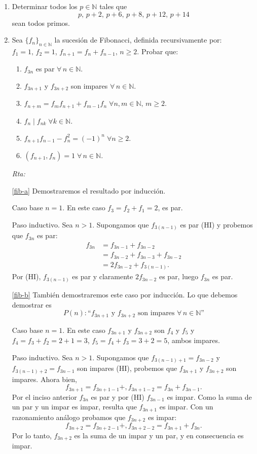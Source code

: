 \documentclass[a4paper,12pt,twoside,spanish,reqno]{amsbook}
\numberwithin{equation}{section}
\newcommand{\rta}{\noindent\textit{Rta: }}
\begin{document}
\begin{enumerate}
\item Determinar todos los $p\in\mathbb N$ tales que
\[ p,\, p+2,\, p+6,\, p+8,\, p+12,\, p+14 \]
sean todos primos.




\item  Sea $\{f_n\}_{n\in\mathbb N}$ la sucesi\'on de Fibonacci, definida recursivamente por: $f_1=1,\, f_2=1$, $f_{n+1}=f_{n}+f_{n-1},\, n\geq 2$. Probar que:
\begin{enumerate}
\item\label{fib-a} $f_{3n}$ es par $\forall\, n\in\mathbb N$.
\item\label{fib-b} $f_{3n+1}$ y $f_{3n+2}$ son impares $\forall\, n\in\mathbb N$.
\item\label{fib-c} $f_{n+m}=f_{m}f_{n+1}+f_{m-1}f_{n}\; \forall n,m\in\mathbb N,\, m\geq 2$.
\item\label{fib-d} $f_n\mid f_{nk}\;  \forall k\in\mathbb N$.
\item\label{fib-e} $f_{n+1}f_{n-1}-f_n^2=(-1)^n\; \forall n\geq 2$.
\item\label{fib-f} $(f_{n+1},f_n)=1\; \forall\, n\in\mathbb N$.
\end{enumerate}

\rta 

\ref{fib-a} Demostraremos el resultado por inducción. 

Caso base $n=1$. En este caso $f_3 = f_2 + f_1 = 2$, es par.

Paso inductivo. Sea $n>1$. Supongamos que $f_{3(n-1)}$ es par (HI) y probemos que $f_{3n}$ es par: 
\begin{align*}
    f_{3n} & = f_{3n-1} + f_{3n-2} \\
           & = f_{3n-2} + f_{3n-3} + f_{3n-2} \\
           & = 2 f_{3n-2} + f_{3(n-1)}. 
\end{align*}
Por (HI), $f_{3(n-1)}$ es par  y claramente $ 2 f_{3n-2}$  es par, luego $f_{3n}$ es par.

\ref{fib-b} También demostraremos este caso por inducción. Lo que debemos demostrar es 
$$
P(n) : \text{``$f_{3n+1}$ y $f_{3n+2}$ son impares $\forall\, n\in\mathbb N$''}
$$

Caso base $n=1$. En este caso $f_{3n+1}$ y $f_{3n+2}$ son $f_{4}$ y $f_{5}$ y $f_4 = f_3+f_2 = 2 +1 =3$, $f_5 = f_4 +f_3 =3 +2 =5$, ambos impares. 

Paso  inductivo.  Sea $n>1$. Supongamos que $f_{3(n-1)+1} = f_{3n-2}$ y $f_{3(n-1)+2} = f_{3n-1}$ son impares (HI), probemos que  $f_{3n+1}$ y $f_{3n+2}$ son impares. 
Ahora bien, 
$$
f_{3n+1} = f_{3n+1 -1} + ,f_{3n+1 -2} =f_{3n} + f_{3n-1}.
$$
Por el inciso anterior $f_{3n}$  es par y por (HI) $f_{3n-1}$ es impar. Como la suma de un par y un impar es impar, resulta que $f_{3n+1}$ es impar. Con un razonamiento análogo probamos que $f_{3n+2}$  es impar:  
$$
f_{3n+2} = f_{3n+2 -1} + ,f_{3n+2 -2} =f_{3n +1} + f_{3n}.
$$
Por lo tanto, $f_{3n+2}$  es la suma de un impar y un par, y en consecuencia es impar. 


\end{enumerate}
\end{document}
